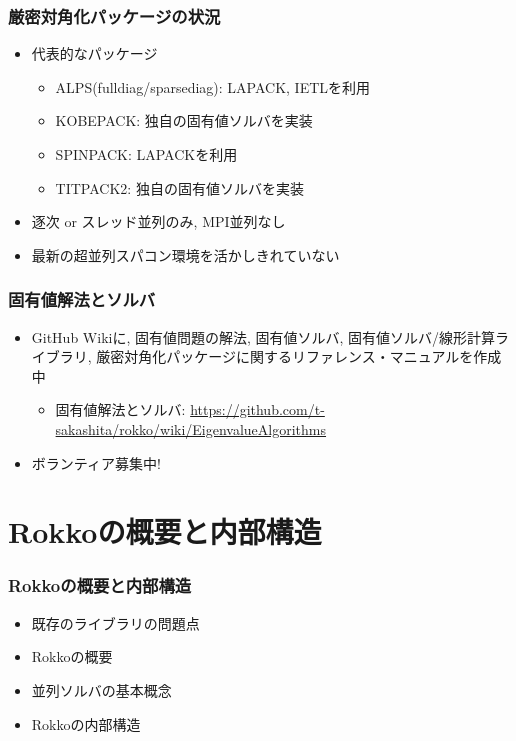 \begin{frame}
  \frametitle{厳密対角化パッケージの状況}
  \begin{itemize}
    \setlength{\itemsep}{1em}
  \item 代表的なパッケージ
    \begin{itemize}
    \item ALPS(fulldiag/sparsediag): LAPACK, IETLを利用
    \item KOBEPACK: 独自の固有値ソルバを実装
    \item SPINPACK: LAPACKを利用
    \item TITPACK2: 独自の固有値ソルバを実装
    \end{itemize}
  \item 逐次 or スレッド並列のみ, MPI並列なし
  \item 最新の超並列スパコン環境を活かしきれていない
  \end{itemize}
\end{frame}

\begin{frame}
  \frametitle{固有値解法とソルバ}
  \begin{itemize}
    \setlength{\itemsep}{1em}
    \item GitHub Wikiに, 固有値問題の解法, 固有値ソルバ, 固有値ソルバ/線形計算ライブラリ, 厳密対角化パッケージに関するリファレンス・マニュアルを作成中
      \begin{itemize}
        \item 固有値解法とソルバ: \url{https://github.com/t-sakashita/rokko/wiki/EigenvalueAlgorithms}
      \end{itemize}
    \item ボランティア募集中!
  \end{itemize}
\end{frame}
        
\section{Rokkoの概要と内部構造}

\begin{frame}
  \frametitle{Rokkoの概要と内部構造}
  \begin{itemize}
    \setlength{\itemsep}{1em}
  \item 既存のライブラリの問題点
  \item Rokkoの概要
  \item 並列ソルバの基本概念
  \item Rokkoの内部構造
  \end{itemize}
\end{frame}

